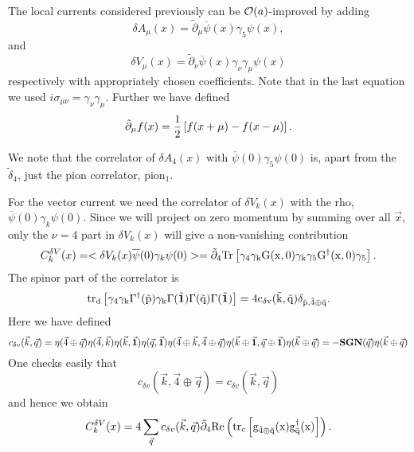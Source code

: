 \documentclass[prd,12pt,superscriptaddress,tightenlines,nofootinbib]{revtex4}
\def\Tr{\rm Tr}
\def\trd{\rm tr_d}
\def\trc{\rm tr_c}
\def\Re{\rm Re}
\begin{document}
\bigskip

\medskip

The local currents considered previously can be ${\cal O}(a)$-improved by
adding
$$ \delta A_\mu(x) = \tilde \partial_\mu 
 \overline \psi(x) \gamma_5 \psi(x), $$
and
$$ \delta V_\mu(x) = \tilde \partial_\nu 
 \overline \psi(x) \gamma_\nu \gamma_\mu \psi(x) $$
respectively with appropriately chosen coefficients. Note that in the
last equation we used $i \sigma_{\mu \nu} = \gamma_\nu \gamma_\mu$. Further
we have defined
$$ \tilde \partial_\mu f(x) = {1 \over 2} \left[ f(x+\mu) - f(x-\mu)
 \right] .$$

We note that the correlator of $\delta A_4(x)$ with $\overline \psi(0)
\gamma_5 \psi(0)$ is, apart from the $\tilde \delta_4$, just the pion
correlator, pion$_1$.

For the vector current we need the correlator of $\delta V_k(x)$ with the
rho, $\overline \psi(0) \gamma_k \psi(0)$. Since we will project on
zero momentum by summing over all $\vec x$, only the $\nu = 4$ part in
$\delta V_k(x)$ will give a non-vanishing contribution
$$ C^{\delta V}_k(x) = < \delta V_k (x) \overline \psi(0) \gamma_k \psi(0)>
 = \tilde \partial_4 \Tr \left[ \gamma_4 \gamma_k G(x,0) \gamma_k
 \gamma_5 G^\dagger (x,0) \gamma_5 \right] .$$ 
The spinor part of the correlator is
$$ \trd \left[ \gamma_4 \gamma_k \Gamma^\dagger(\vec p) \gamma_k
 \Gamma(\vec {\bf 1}) \Gamma(\vec q) \Gamma(\vec {\bf 1}) \right] = 
 4 c_{\delta v}(\vec k, \vec q) \delta_{\vec p, \vec 4 \oplus \vec q}. $$
Here we have defined
$$ c_{\delta v}(\vec k, \vec q) = \eta(\vec 4 \oplus \vec q)
 \eta(\vec 4, \vec k) \eta(\vec k, \vec {\bf 1}) \eta(\vec q, \vec {\bf 1}) 
 \eta(\vec 4 \oplus \vec k, \vec 4 \oplus \vec q)
 \eta(\vec k \oplus \vec {\bf 1}, \vec q \oplus \vec {\bf 1})
 \eta(\vec k \oplus \vec q) 
 = - {\bf SGN}(\vec q) \eta(\vec k \oplus \vec q) $$
One checks easily that
$$ c_{\delta v}(\vec k, \vec 4 \oplus \vec q) =
 c_{\delta v}(\vec k, \vec q) $$
and hence we obtain
$$ C^{\delta V}_k(x) = 4 \sum_{\vec q} c_{\delta v}(\vec k, \vec q)
 \tilde \partial_4 \Re \left( \trc \left[ g_{\vec 4 \oplus \vec q}(x) 
 g_{\vec q}^\dagger (x) \right] \right). $$


\end{document}
